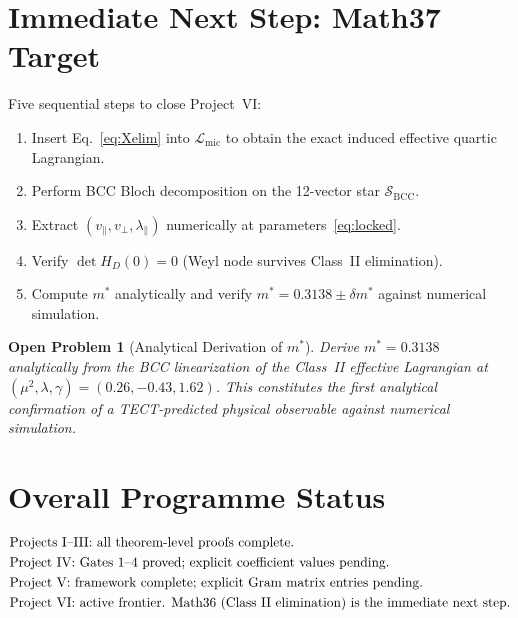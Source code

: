 \documentclass[11pt,a4paper]{article}
\newcommand{\mstar}{m^{*}}
\newtheorem{openproblem}[theorem]{Open Problem}
\begin{document}
\section{Immediate Next Step: Math37 Target}

Five sequential steps to close Project~VI:
\begin{enumerate}
\item Insert Eq.~\eqref{eq:Xelim} into $\mathcal{L}_{\mathrm{mic}}$ to obtain
      the exact induced effective quartic Lagrangian.
\item Perform BCC Bloch decomposition on the 12-vector star
      $\mathcal{S}_{\mathrm{BCC}}$.
\item Extract $(v_{\parallel},v_{\perp},\lambda_{\parallel})$ numerically
      at parameters~\eqref{eq:locked}.
\item Verify $\det H_{D}(0)=0$ (Weyl node survives Class~II elimination).
\item Compute $\mstar$ analytically and verify $\mstar=0.3138\pm\delta\mstar$
      against numerical simulation.
\end{enumerate}

\begin{openproblem}[Analytical Derivation of $\mstar$]
Derive $\mstar=0.3138$ analytically from the BCC linearization of the
Class~II effective Lagrangian at $(\mu^{2},\lambda,\gamma)=(0.26,-0.43,1.62)$.
This constitutes the first analytical confirmation of a TECT-predicted
physical observable against numerical simulation.
\end{openproblem}

\section{Overall Programme Status}

\begin{align}
&\text{Projects I--III: all theorem-level proofs complete.}\notag\\
&\text{Project IV: Gates 1--4 proved; explicit coefficient values pending.}\notag\\
&\text{Project V: framework complete; explicit Gram matrix entries pending.}\notag\\
&\text{Project VI: active frontier. Math36 (Class~II elimination) is the immediate next step.}
\end{align}
\end{document}
